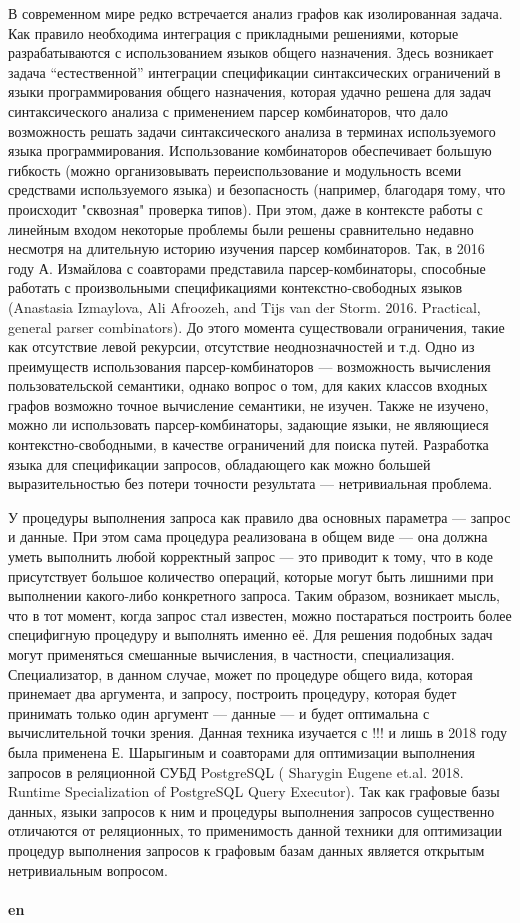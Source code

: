 \documentclass[12pt]{article}  %
\theoremstyle{remark}
\begin{document}
В современном мире редко встречается анализ графов как изолированная задача.
Как правило необходима интеграция с прикладными решениями, которые разрабатываются с использованием языков общего назначения.
Здесь возникает задача ``естественной'' интеграции спецификации синтаксических ограничений в языки программирования общего назначения, которая удачно решена для задач синтаксического анализа с применением парсер комбинаторов, что дало возможность решать задачи синтаксического анализа в терминах используемого языка программирования.
Использование комбинаторов обеспечивает большую гибкость (можно организовывать переиспользование и модульность всеми средствами используемого языка) и безопасность (например, благодаря тому, что происходит "сквозная" проверка типов).
При этом, даже в контексте работы с линейным входом некоторые проблемы были решены сравнительно недавно несмотря на длительную историю изучения парсер комбинаторов.
Так, в 2016 году А. Измайлова с соавторами представила парсер-комбинаторы, способные работать с произвольными спецификациями контекстно-свободных языков (Anastasia Izmaylova, Ali Afroozeh, and Tijs van der Storm. 2016. Practical, general parser combinators).
До этого момента существовали ограничения, такие как отсутствие левой рекурсии, отсутствие неоднозначностей и т.д.
Одно из преимуществ использования парсер-комбинаторов --- возможность вычисления пользовательской семантики, однако вопрос о том, для каких классов входных графов возможно точное вычисление семантики, не изучен.
Также не изучено, можно ли использовать парсер-комбинаторы, задающие языки, не являющиеся контекстно-свободными, в качестве ограничений для поиска путей.
Разработка языка для спецификации запросов, обладающего как можно большей выразительностью без потери точности результата --- нетривиальная проблема.

У процедуры выполнения запроса как правило два основных параметра --- запрос и данные.
При этом сама процедура реализована в общем виде --- она должна уметь выполнить любой корректный запрос --- это приводит к тому, что в коде присутствует большое количество операций, которые могут быть лишними при выполнении какого-либо конкретного запроса. Таким образом, возникает мысль, что в тот момент, когда запрос стал известен, можно постараться построить более специфигную процедуру и выполнять именно её. Для решения подобных задач могут применяться смешанные вычисления, в частности, специализация. Специализатор, в данном случае, может по процедуре общего вида, которая принемает два аргумента, и запросу, построить процедуру, которая будет принимать только один аргумент --- данные --- и будет оптимальна с вычислительной точки зрения. Данная техника изучается с !!! и лишь в 2018 году была применена Е. Шарыгиным и соавторами для оптимизации выполнения запросов в реляционной СУБД PostgreSQL ( Sharygin Eugene et.al. 2018. Runtime Specialization of PostgreSQL Query Executor). Так как графовые базы данных, языки запросов к ним и процедуры выполнения запросов существенно отличаются от реляционных, то применимость данной техники для оптимизации процедур выполнения запросов к графовым базам данных является открытым нетривиальным вопросом.
\\
\\
\textbf{en}\\
\end{document}
